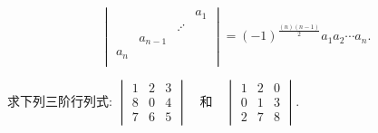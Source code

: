\begin{frame}
\begin{example} \footnotesize
\[\begin{vmatrix}
& & &a_{1}\\
& &\iddots&\\
&a_{n-1}& & \\
a_{n}& & &\\
\end{vmatrix}=(-1)^{\frac{(n)(n-1)}{2}}a_{1}a_{2}\cdots a_{n}.\]
\end{example}

\pp
\begin{example}
求下列三阶行列式: $\begin{vmatrix}
1 & 2 & 3\\
8 & 0 & 4\\
7 & 6 & 5
\end{vmatrix} \quad
\text{和}\quad \begin{vmatrix}
1 & 2 & 0\\
0 & 1 & 3\\
2 & 7 & 8
\end{vmatrix}$.
\end{example}
\end{frame}





